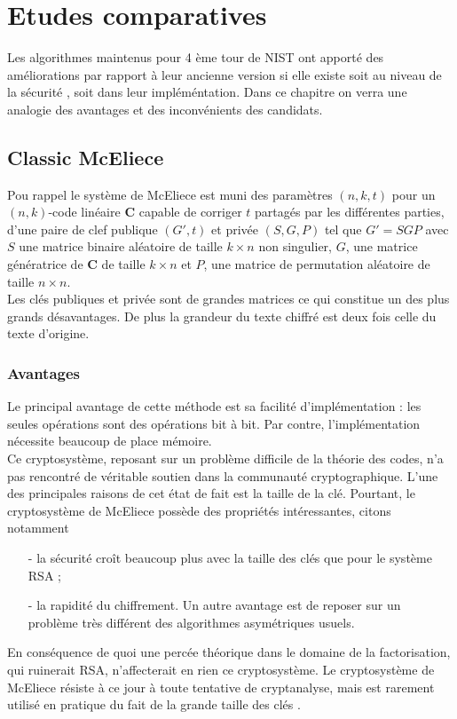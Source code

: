 \documentclass[12pt,openany]{report}
\begin{document}
\chapter{Etudes comparatives}
\minitoc
\newpage
Les algorithmes maintenus pour 4 ème tour de NIST ont apporté des améliorations par rapport à leur ancienne version si elle existe soit au niveau de la sécurité , soit dans leur impléméntation. Dans ce chapitre on verra une analogie des avantages et des inconvénients des candidats.

\section{Classic McEliece}
Pou rappel le système de McEliece est muni des paramètres $(n,k,t) $ pour un  $(n,k)$-code linéaire \textbf{C} capable de corriger $t$ partagés par les différentes parties, d'une paire de clef publique 
$({\mathit{G'}},t )$ et privée $(\mathit{S},\mathit{G},\mathit{P})$ tel que $ {\mathit{G'}}=\mathit{S} \mathit{G}\mathit{P} $ avec $ \mathit{S} $ une matrice binaire aléatoire de taille $k \times n   $ non singulier, $\mathit{G} $, une matrice génératrice de \textbf{C} de taille $k \times n  $ et $ P $, une matrice de permutation aléatoire de taille $ n \times n $. \\ Les clés publiques et privée sont de grandes matrices ce qui constitue un des plus grands désavantages. De plus la grandeur du texte chiffré est deux fois celle du texte d'origine.\cite{McEliece2}




\subsection{Avantages}

Le principal avantage de cette méthode est sa facilité d’implémentation :
les seules opérations sont des opérations bit à bit. Par contre, l’implémentation nécessite
beaucoup de place mémoire.\\
Ce cryptosystème, reposant sur un problème difficile de la théorie des codes, n’a pas
rencontré de véritable soutien dans la communauté cryptographique. L’une des principales
raisons de cet état de fait est la taille de la clé. Pourtant, le cryptosystème de McEliece
possède des propriétés intéressantes, citons notamment
\begin{itemize}


\item[-] la sécurité croît beaucoup plus avec la taille des clés que pour le système RSA ;
\item[-] la rapidité du chiffrement.
Un autre avantage est de reposer sur un problème très différent des algorithmes
asymétriques usuels.
\end{itemize}
En conséquence de quoi une percée théorique dans le domaine de la factorisation, qui
ruinerait RSA, n’affecterait en rien ce cryptosystème. Le cryptosystème de McEliece résiste à
ce jour à toute tentative de cryptanalyse, mais est rarement utilisé en pratique du fait de la
grande taille des clés . 
\end{document}
